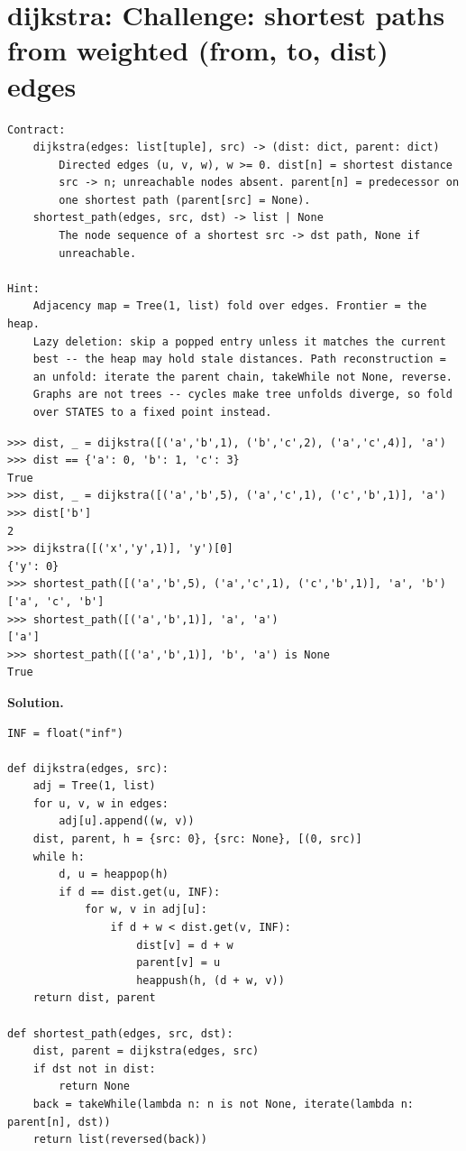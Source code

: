 \documentclass[10pt,letterpaper]{book}
\begin{document}
\section{dijkstra: Challenge: shortest paths from weighted (from, to, dist) edges}
\begin{lstlisting}[style=ex]
Contract:
    dijkstra(edges: list[tuple], src) -> (dist: dict, parent: dict)
        Directed edges (u, v, w), w >= 0. dist[n] = shortest distance
        src -> n; unreachable nodes absent. parent[n] = predecessor on
        one shortest path (parent[src] = None).
    shortest_path(edges, src, dst) -> list | None
        The node sequence of a shortest src -> dst path, None if
        unreachable.

Hint:
    Adjacency map = Tree(1, list) fold over edges. Frontier = the heap.
    Lazy deletion: skip a popped entry unless it matches the current
    best -- the heap may hold stale distances. Path reconstruction =
    an unfold: iterate the parent chain, takeWhile not None, reverse.
    Graphs are not trees -- cycles make tree unfolds diverge, so fold
    over STATES to a fixed point instead.
\end{lstlisting}
\begin{lstlisting}[style=ex]
>>> dist, _ = dijkstra([('a','b',1), ('b','c',2), ('a','c',4)], 'a')
>>> dist == {'a': 0, 'b': 1, 'c': 3}
True
>>> dist, _ = dijkstra([('a','b',5), ('a','c',1), ('c','b',1)], 'a')
>>> dist['b']
2
>>> dijkstra([('x','y',1)], 'y')[0]
{'y': 0}
>>> shortest_path([('a','b',5), ('a','c',1), ('c','b',1)], 'a', 'b')
['a', 'c', 'b']
>>> shortest_path([('a','b',1)], 'a', 'a')
['a']
>>> shortest_path([('a','b',1)], 'b', 'a') is None
True
\end{lstlisting}
\noindent\textbf{Solution.}
\begin{lstlisting}[style=code]
INF = float("inf")

def dijkstra(edges, src):
    adj = Tree(1, list)
    for u, v, w in edges:
        adj[u].append((w, v))
    dist, parent, h = {src: 0}, {src: None}, [(0, src)]
    while h:
        d, u = heappop(h)
        if d == dist.get(u, INF):
            for w, v in adj[u]:
                if d + w < dist.get(v, INF):
                    dist[v] = d + w
                    parent[v] = u
                    heappush(h, (d + w, v))
    return dist, parent

def shortest_path(edges, src, dst):
    dist, parent = dijkstra(edges, src)
    if dst not in dist:
        return None
    back = takeWhile(lambda n: n is not None, iterate(lambda n: parent[n], dst))
    return list(reversed(back))
\end{lstlisting}
\end{document}

